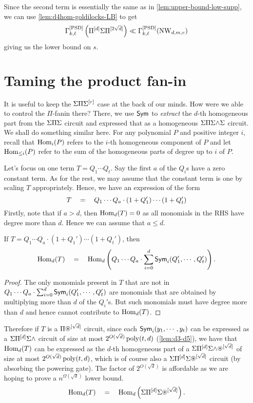 Since the second term is essentially the same as in \autoref{lem:upper-bound-low-supp}, we can use \autoref{lem:d4hom-goldilocks-LB} to get
\[
\Gamma^{\mathrm{[PSD]}}_{k,\ell}\left(\Pi^{[d]}\Sigma\Pi^{[2\sqrt{d}]}\right) \ll \Gamma^{\mathrm{[PSD]}}_{k,\ell}(\operatorname{\mathrm{NW}}_{d,m,e})
\]
giving us the lower bound on $s$. 

\section{Taming the product fan-in}

It is useful to keep the $\Sigma\Pi\Sigma^{[r]}$ case at the back of our minds.
How were we able to control the $\Pi$-fanin there?
There, we use $\operatorname{\mathsf{Sym}}$ to \emph{extract} the $d$-th homogeneous part from the $\Sigma\Pi\Sigma$ circuit and expressed that as a homogeneous $\Sigma\Pi\Sigma\mathord{\wedge}\Sigma$ circuit. 
We shall do something similar here.
For any polynomial $P$ and positive integer $i$, recall that $\operatorname{Hom}_i(P)$ refers to the $i$-th homogeneous component of $P$ and let $\operatorname{Hom}_{\leq i}(P)$ refer to the sum of the  homogeneous parts of degree up to $i$ of $P$. 

Let's focus on one term $T = Q_1 \cdots Q_t$. Say the first $a$ of the $Q_i$s have a zero constant term. As for the rest, we may assume that the constant term is one by scaling $T$ appropriately. Hence, we have an expression of the form 
\[
T \quad = \quad Q_1 \cdots Q_a \cdot (1 + Q_{1}') \cdots (1 + Q_t')
\]
Firstly, note that if $a > d$, then $\operatorname{Hom}_d(T) = 0$ as all monomials in the RHS have degree more than $d$. Hence we can assume that $a\leq d$. 

\begin{claim}
If $T = Q_1 \cdots Q_a \cdot (1 + Q_{1}') \cdots (1 + Q_t')$, then 
\[
\operatorname{Hom}_d(T) \quad = \quad \operatorname{Hom}_d\left(Q_1 \cdots Q_a \cdot \sum_{i=0}^d \operatorname{\mathsf{Sym}}_i(Q_{1}', \cdots,  Q_t')\right).
\]
\end{claim}
\begin{proof}
The only monomials present in $T$ that are not in $Q_1 \cdots Q_a \cdot \sum_{i=0}^d \operatorname{\mathsf{Sym}}_i(Q_{1}', \cdots,  Q_t')$ are monomials that are obtained by multiplying more than $d$ of the $Q_i'$s. But such monomials must have degree more than $d$ and hence cannot contribute to $\operatorname{Hom}_d(T)$. 
\end{proof}

Therefore if $T$ is a $\Pi\circast^{[\sqrt{d}]}$ circuit, since each $\operatorname{\mathsf{Sym}}_i(y_1,\cdots, y_t)$ can be expressed as a $\Sigma\Pi^{[d]}\Sigma\mathord{\wedge}$ circuit of size at most $2^{O(\sqrt{d})} \operatorname{poly}(t,d)$ (\autoref{lem:d3-d5}), we have that $\operatorname{Hom}_d(T)$ can be expressed as the $d$-th homogeneous part of a  $\Sigma\Pi^{[d]}\Sigma\mywedge\circast^{[\sqrt{d}]}$ of size at most $2^{O(\sqrt{d})} \operatorname{poly}(t,d)$, which is of course also a $\Sigma\Pi^{[d]}\Sigma\circast^{[\sqrt{d}]}$ circuit (by absorbing the powering gate). The factor of $2^{O(\sqrt{d})}$ is affordable as we are hoping to prove a $n^{\Omega(\sqrt{d})}$ lower bound. 
\[
\Hom_d(T) \spaced{=} \Hom_d\inparen{\Sigma\Pi^{[d]}\Sigma\circast^{[\sqrt{d}]}}.
\]

